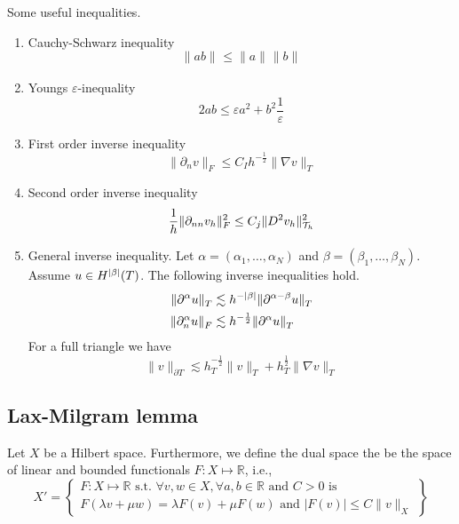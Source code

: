 Some useful inequalities.
\begin{enumerate}[label=(\roman*)]
    \item Cauchy-Schwarz inequality
    \[
     \| ab \|_{  }^{  }  \le \| a \|_{  }^{  } \| b \|_{  }^{  }
    \]
    \item Youngs $\varepsilon $-inequality
        \[
            2ab \le \varepsilon a^2+ b^2 \frac{1}{\varepsilon }
        \]
    \item  First order inverse inequality  \[
    \| \partial _{n} v \|_{ F   }^{  } \le  C_{I} h_{}^{-\frac{1}{2}} \| \nabla v \|_{  T}^{  }
    \]
    \item Second order inverse inequality
        \[
            \frac{1}{h}\| \partial _{nn}  v_{h} \|_{F   }^{2  }  \le C_{j} \| D ^2 v_{h} \|_{ \mathcal{T} _{h} }^{ 2 }   \\
        \]
    \item General inverse inequality.
    Let $\alpha = ( \alpha _{1}, \ldots, \alpha _{N}) $ and $\beta = ( \beta _{1}, \ldots, \beta _{N} ) $.
    Assume $u \in H^{\left\lvert  \beta   \right\rvert  }( T) $. The following inverse inequalities hold.
    \[
        \begin{split}
        \| \partial ^{\alpha } u \|_{T  }^{  } & \lesssim h^{ - \left\lvert  \beta   \right\rvert  } \| \partial ^{\alpha - \beta } u \|_{T }^{  } \\
        \| \partial ^{\alpha }_{n} u  \|_{F  }^{  } &\lesssim h^{-\frac{1}{2}  } \| \partial ^{\alpha } u \|_{T }^{  }
        \end{split}
    \]
    For a full triangle we have \[
    \| v \|_{ \partial T }^{  } \lesssim h_{T}^{-\frac{1}{2}} \| v \|_{ T }^{  } + h_{T}^{\frac{1}{2}} \| \nabla v \|_{ T }^{  }
    \]
\end{enumerate}




\subsection{Lax-Milgram lemma}%
\label{sub:lax_milgram_lemma}


\begin{definition}
    \label{def:linear_function}
Let $X$ be a Hilbert space. Furthermore, we define the dual space the be the space of linear and bounded functionals $F: X  \mapsto \mathbb{R} $, i.e., \[
X'  =
\left.
\begin{cases}
F: X  \mapsto \mathbb{R} \text{ s.t. }\forall v,w \in X, \forall a,b \in \mathbb{R} \text{ and } C> 0 \text{ is }   \\
  F\left( \lambda v + \mu w  \right) = \lambda F(v) + \mu F(w) \text{ and } \left\lvert F\left( v \right)  \right\rvert \le C \| v \|_{ X  }^{  }
\end{cases}
  \right\}
\]
\end{definition}

